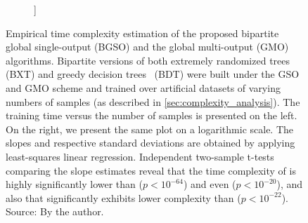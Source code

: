 \begin{figure}[tb]
\begin{subfigure}{0.49\textwidth}
{        ]}
    \end{subfigure}
    \caption{
        Empirical time complexity estimation of the proposed bipartite global single-output (BGSO) and the global multi-output (GMO)~\cite{pliakos2018global}
        algorithms. Bipartite versions of both extremely randomized trees~\cite{geurts2006extremely} (BXT) and greedy decision trees~\cite{breiman1984classification} (BDT) were built under the GSO and GMO scheme and trained over artificial datasets of varying numbers of samples (as described in \autoref{sec:complexity_analysis}). The training time versus the number of samples is presented on the left. On the right, we present the same plot on a logarithmic scale. The slopes and respective standard deviations are obtained by applying least-squares linear regression.
        Independent two-sample t-tests comparing the slope estimates reveal that the time complexity of  is highly significantly lower than  ($p < 10^{-64}$) and even  ($p < 10^{-20}$), and also that  significantly exhibits lower complexity than  ($p < 10^{-22}$).
        \newline Source: By the author.
    }
    \label{fig:empirical_complexity}
\end{figure}


